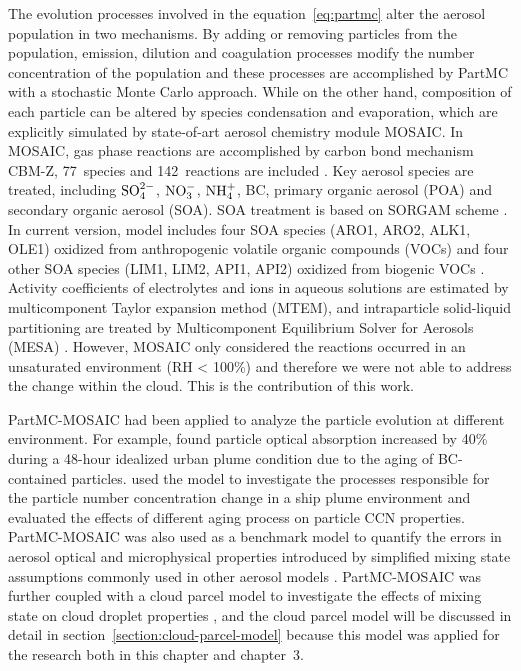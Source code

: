 \documentclass[edeposit,fullpage]{uiucthesis2009}
\begin{document}
The evolution processes involved in the equation~\ref{eq:partmc} alter the aerosol population in two mechanisms. By adding or removing particles from the population, emission, dilution and coagulation processes modify the number concentration of the population and these processes are accomplished by PartMC with a stochastic Monte Carlo approach. While on the other hand, composition of each particle can be altered by species condensation and evaporation, which are explicitly simulated by state-of-art aerosol chemistry module MOSAIC. In MOSAIC, gas phase reactions are accomplished by carbon bond mechanism CBM-Z, 77~species and 142~reactions are included \citep{Zaveri1999}. Key aerosol species are treated, including $\rm SO_4^{2-}$, $\rm NO_3^-$, $\rm NH_4^+$, BC, primary organic aerosol (POA) and secondary organic aerosol (SOA). SOA treatment is based on SORGAM scheme \citep{schell2001modeling}. In current version, model includes four SOA species (ARO1, ARO2, ALK1, OLE1) oxidized from anthropogenic volatile organic compounds (VOCs) and four other SOA species (LIM1, LIM2, API1, API2) oxidized from biogenic VOCs \citep{ching2012impacts}. Activity coefficients of electrolytes and ions in aqueous solutions are estimated by multicomponent Taylor expansion method (MTEM), and intraparticle solid-liquid partitioning are treated by Multicomponent Equilibrium Solver for Aerosols (MESA) \citep{zaveri2005computationally}. However, MOSAIC only considered the reactions occurred in an unsaturated environment (RH < 100\%) and therefore we were not able to address the change within the cloud. This is the contribution of this work. 

PartMC-MOSAIC had been applied to analyze the particle evolution at different environment. For example, \citet{Zaveri2010a} found particle optical absorption increased by 40\% during a 48-hour idealized urban plume condition due to the aging of BC-contained particles. \citet{tian2014modeling} used the model to investigate the processes responsible for the particle number concentration change in a ship plume environment and evaluated the effects of different aging process on particle CCN properties. PartMC-MOSAIC was also used as a benchmark model to quantify the errors in aerosol optical and microphysical properties introduced by simplified mixing state assumptions commonly used in other aerosol models \citep{Zaveri2010a, ching2012impacts, Fierce2017}. PartMC-MOSAIC was further coupled with a cloud parcel model to investigate the effects of mixing state on cloud droplet properties \citep{ching2012impacts, Ching2016}, and the cloud parcel model will be discussed in detail in section~\ref{section:cloud-parcel-model} because this model was applied for the research both in  this chapter and chapter~3. 
\end{document}
